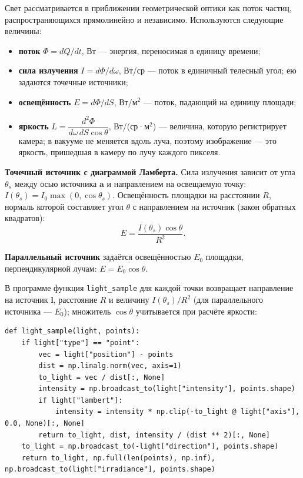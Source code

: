 \documentclass[12pt,a4paper]{article}
\newcommand{\vect}[1]{\mathbf{#1}}
\begin{document}
Свет рассматривается в приближении геометрической оптики как поток частиц, распространяющихся
прямолинейно и независимо. Используются следующие величины:

\begin{itemize}
\item \textbf{поток} $\Phi = dQ/dt$, Вт — энергия, переносимая в единицу времени;
\item \textbf{сила излучения} $I = d\Phi/d\omega$, Вт/ср — поток в единичный телесный угол; ею задаются точечные источники;
\item \textbf{освещённость} $E = d\Phi/dS$, Вт/м$^2$ — поток, падающий на единицу площади;
\item \textbf{яркость} $L = \dfrac{d^2\Phi}{d\omega\, dS\cos\theta}$, Вт/(ср·м$^2$) — величина, которую регистрирует камера; в вакууме не меняется вдоль луча, поэтому изображение — это яркость, пришедшая в камеру по лучу каждого пикселя.
\end{itemize}

\textbf{Точечный источник с диаграммой Ламберта.} Сила излучения зависит от угла $\theta_s$ между осью источника
$\vect a$ и направлением на освещаемую точку: $I(\theta_s) = I_0 \max(0, \cos\theta_s)$.
Освещённость площадки на расстоянии $R$, нормаль которой составляет угол $\theta$ с направлением на источник
(закон обратных квадратов):
\begin{equation}
E = \frac{I(\theta_s)\cos\theta}{R^2}.
\label{eq:point}
\end{equation}

\textbf{Параллельный источник} задаётся освещённостью $E_0$ площадки, перпендикулярной лучам: $E = E_0\cos\theta$.

В программе функция \texttt{light\_sample} для каждой точки возвращает направление на источник $\vect l$,
расстояние $R$ и величину $I(\theta_s)/R^2$ (для параллельного источника — $E_0$); множитель $\cos\theta$
учитывается при расчёте яркости:

\begin{lstlisting}
def light_sample(light, points):
    if light["type"] == "point":
        vec = light["position"] - points
        dist = np.linalg.norm(vec, axis=1)
        to_light = vec / dist[:, None]
        intensity = np.broadcast_to(light["intensity"], points.shape)
        if light["lambert"]:
            intensity = intensity * np.clip(-to_light @ light["axis"], 0.0, None)[:, None]
        return to_light, dist, intensity / (dist ** 2)[:, None]
    to_light = np.broadcast_to(-light["direction"], points.shape)
    return to_light, np.full(len(points), np.inf), np.broadcast_to(light["irradiance"], points.shape)
\end{lstlisting}
\end{document}
